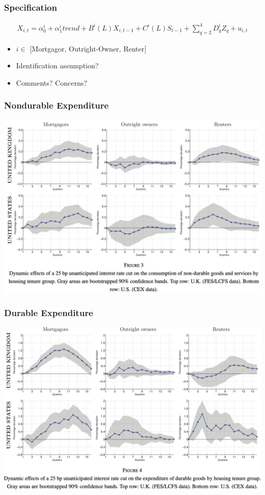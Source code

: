 \documentclass[english,xcolor=svgnames]{beamer}
\begin{document}
\begin{frame}
\frametitle[alignment=center]{Specification}
\begin{align*}
	X_{i,t} = \alpha_0^i + \alpha_1^i trend + B^i(L)X_{i,t-1} + C^i(L)S_{t-1} + \sum_{q=2}^{4}D_q^i Z_q + u_{i,t}
\end{align*}
\begin{itemize}
	\item $i \in$ [Mortgagor, Outright-Owner, Renter]
	\item Identification assumption?
	\item Comments? Concerns?
\end{itemize}
\end{frame}

\begin{frame}
\frametitle[alignment=center]{Nondurable Expenditure}
\centering
\includegraphics[scale=0.3]{figures/CFSFIG3.png}
\end{frame}

\begin{frame}
\frametitle[alignment=center]{Durable Expenditure}
\centering
\includegraphics[scale=0.3]{figures/CFSFIG4.png}
\end{frame}
\end{document}
